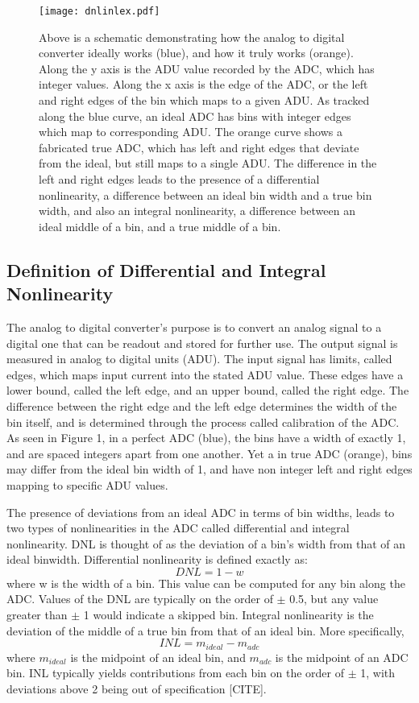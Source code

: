 \documentclass[11pt, letterpaper]{article}
\begin{document}
\begin{figure}
	\texttt{[image: dnlinlex.pdf]}
	\caption{Above is a schematic demonstrating how the analog to digital converter ideally works (blue), and how it truly works (orange). Along the y axis is the ADU value recorded by the ADC, which has integer values. Along the x axis is the edge of the ADC, or the left and right edges of the bin which maps to a given ADU. As tracked along the blue curve, an ideal ADC has bins with integer edges which map to corresponding ADU. The orange curve shows a fabricated true ADC, which has left and right edges that deviate from the ideal, but still maps to a single ADU. The difference in the left and right edges leads to the presence of a differential nonlinearity, a difference between an ideal bin width and a true bin width, and also an integral nonlinearity, a difference between an ideal middle of a bin, and a true middle of a bin.}
\end{figure}

\subsection{Definition of Differential and Integral Nonlinearity}
\indent 


The analog to digital converter’s purpose is to convert an analog signal to a digital one that can be readout and stored for further use. 
The output signal is measured in analog to digital units (ADU). 
The input signal has limits, called edges, which maps input current into the stated ADU value. 
These edges have a lower bound, called the left edge, and an upper bound, called the right edge.
The difference between the right edge and the left edge determines the width of the bin itself, and is determined through the process called calibration of the ADC. 
As seen in Figure 1, in a perfect ADC (blue), the bins have a width of exactly 1, and are spaced integers apart from one another. 
Yet a in true ADC (orange), bins may differ from the ideal bin width of 1, and have non integer left and right edges mapping to specific ADU values. 
\indent 


The presence of deviations from an ideal ADC in terms of bin widths, leads to two types of nonlinearities in the ADC called differential and integral nonlinearity. 
DNL is thought of as the deviation of a bin's width from that of an ideal binwidth. 
Differential nonlinearity is defined exactly as: 
\[ DNL =1- w \]  
where w is the width of a bin. 
This value can be computed for any bin along the ADC. 
Values of the DNL are typically on the order of $\pm$ 0.5, but any value greater than $\pm$ 1 would indicate a skipped bin. 
Integral nonlinearity is the deviation of the middle of a true bin from that of an ideal bin.
More specifically, 
\[ INL = m_{ideal} - m_{adc} \]
where $m_{ideal}$ is the midpoint of an ideal bin, and $m_{adc}$ is the midpoint of an ADC bin. 
INL typically yields contributions from each bin on the order of $\pm$ 1, with deviations above 2 being out of specification [CITE].
\indent
\end{document}
